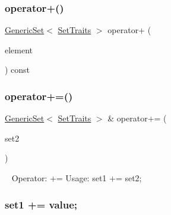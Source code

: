 \subsubsection{\texorpdfstring{operator+()}{operator+()}\hspace{0.1cm}{\footnotesize\ttfamily [2/2]}}
{\footnotesize\ttfamily \mbox{\hyperlink{classstanfordcpplib_1_1collections_1_1GenericSet}{Generic\+Set}}$<$ \mbox{\hyperlink{structstanfordcpplib_1_1collections_1_1SetTraits}{Set\+Traits}} $>$ operator+ (\begin{DoxyParamCaption}\item[{const \mbox{\hyperlink{classstanfordcpplib_1_1collections_1_1GenericSet_a669c81f158766925e7293f97c0099b28}{value\+\_\+type}} \&}]{element }\end{DoxyParamCaption}) const}

\mbox{\label{classstanfordcpplib_1_1collections_1_1GenericSet_af79734e82170dc5c5c9304a9d1898d57}} 
\subsubsection{\texorpdfstring{operator+=()}{operator+=()}\hspace{0.1cm}{\footnotesize\ttfamily [1/2]}}
{\footnotesize\ttfamily \mbox{\hyperlink{classstanfordcpplib_1_1collections_1_1GenericSet}{Generic\+Set}}$<$ \mbox{\hyperlink{structstanfordcpplib_1_1collections_1_1SetTraits}{Set\+Traits}} $>$ \& operator+= (\begin{DoxyParamCaption}\item[{const \mbox{\hyperlink{classstanfordcpplib_1_1collections_1_1GenericSet}{Generic\+Set}}$<$ \mbox{\hyperlink{structstanfordcpplib_1_1collections_1_1SetTraits}{Set\+Traits}} $>$ \&}]{set2 }\end{DoxyParamCaption})}



~\newline
 Operator\+: += Usage\+: set1 += set2; \subsubsection*{set1 += value; }

